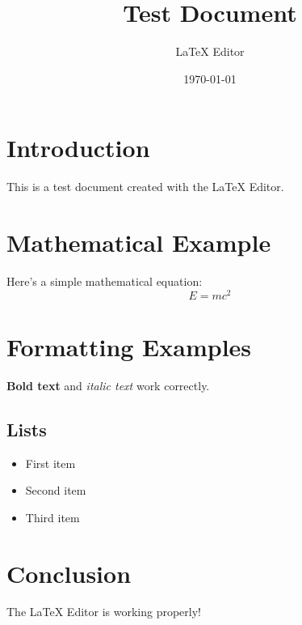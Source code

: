 \documentclass{article}
\title{Test Document}
\author{LaTeX Editor}
\date{\today}
\begin{document}
\maketitle

\section{Introduction}
This is a test document created with the LaTeX Editor.

\section{Mathematical Example}
Here's a simple mathematical equation:
\begin{equation}
    E = mc^2
\end{equation}

\section{Formatting Examples}
\textbf{Bold text} and \textit{italic text} work correctly.

\subsection{Lists}
\begin{itemize}
    \item First item
    \item Second item
    \item Third item
\end{itemize}

\section{Conclusion}
The LaTeX Editor is working properly!
\end{document}

